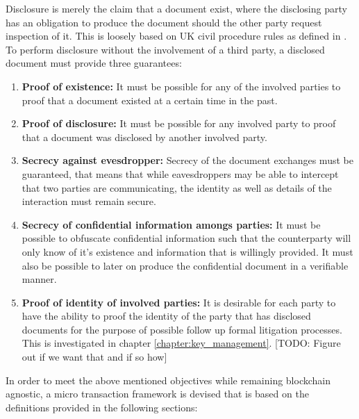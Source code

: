 \documentclass[12pt,msc,a4paper,oneside]{ucl_thesis}
\begin{document}
Disclosure is merely the claim that a document exist, where the disclosing party has an obligation to produce the document should the other party request inspection of it. This is loosely based on UK civil procedure rules as defined in \cite{justice_gov:civil_procedure_rules}. To perform disclosure without the involvement of a third party, a disclosed document must provide three guarantees:
\begin{enumerate}
    \item{\textbf{Proof of existence:}} It must be possible for any of the involved parties to proof that a document existed at a certain time in the past. \label{itm:disclosure_document_objectives_existence}

    \item{\textbf{Proof of disclosure:}} It must be possible for any involved party to proof that a document was disclosed by another involved party. \label{itm:disclosure_document_objectives_disclosure}

    \item{\textbf{Secrecy against evesdropper:}} Secrecy of the document exchanges must be guaranteed, that means that while eavesdroppers may be able to intercept that two parties are communicating, the identity as well as details of the interaction must remain secure. \label{itm:disclosure_document_objectives_evesdrop}

    \item{\textbf{Secrecy of confidential information amongs parties:}} It must be possible to obfuscate confidential information such that the counterparty will only know of it's existence and information that is willingly provided. It must also be possible to later on produce the confidential document in a verifiable manner. \label{itm:disclosure_document_objectives_confidential}

    \item{\textbf{Proof of identity of involved parties:}} It is desirable for each party to have the ability to proof the identity of the party that has disclosed documents for the purpose of possible follow up formal litigation processes. This is investigated in chapter \ref{chapter:key_management}. [TODO: Figure out if we want that and if so how] \label{itm:disclosure_document_objectives_identification}
\end{enumerate}
In order to meet the above mentioned objectives while remaining blockchain agnostic, a micro transaction framework is devised that is based on the definitions provided in the following sections:
\end{document}
